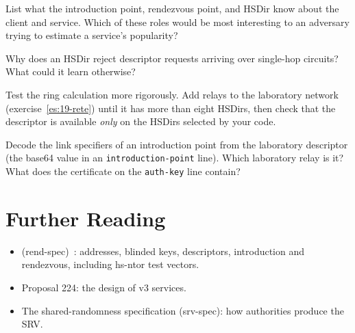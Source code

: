 \begin{esercizio}[2]\label{es:14-ruoli}
List what the introduction point, rendezvous point, and HSDir know about the client and service. Which of these roles would be most interesting to an adversary trying to estimate a service's popularity?
\end{esercizio}

\begin{esercizio}[2]\label{es:14-anonimo}
Why does an HSDir reject descriptor requests arriving over single-hop circuits? What could it learn otherwise?
\end{esercizio}

\begin{esercizio}[3]\label{es:14-anello}
Test the ring calculation more rigorously. Add relays to the laboratory network (exercise~\ref{es:19-rete}) until it has more than eight HSDirs, then check that the descriptor is available \emph{only} on the HSDirs selected by your code.
\end{esercizio}

\begin{esercizio}[3]\label{es:14-ipt}
Decode the link specifiers of an introduction point from the laboratory descriptor (the base64 value in an \texttt{introduction-point} line). Which laboratory relay is it? What does the certificate on the \texttt{auth-key} line contain?
\end{esercizio}

\section*{Further Reading}
\begin{itemize}
  \item {} (rend-spec)~\cite{torspec}: addresses, blinded keys, descriptors, introduction and rendezvous, including hs-ntor test vectors.
  \item Proposal 224: the design of v3 services.
  \item The shared-randomness specification (srv-spec): how authorities produce the SRV.
\end{itemize}
